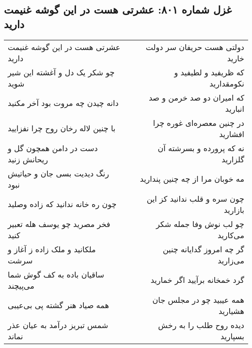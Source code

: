 \begin{center}
\section*{غزل شماره ۸۰۱: عشرتی هست در این گوشه غنیمت دارید}
\label{sec:0801}
\begin{longtable}{l p{0.5cm} r}
عشرتی هست در این گوشه غنیمت دارید
&&
دولتی هست حریفان سر دولت خارید
\\
چو شکر یک دل و آغشته این شیر شوید
&&
که ظریفید و لطیفید و نکومقدارید
\\
دانه چیدن چه مروت بود آخر مکنید
&&
که امیران دو صد خرمن و صد انبارید
\\
با چنین لاله رخان روح چرا نفزایید
&&
در چنین معصره‌ای غوره چرا افشارید
\\
دست در دامن همچون گل و ریحانش زنید
&&
نه که پرورده و بسرشته آن گلزارید
\\
رنگ دیدیت بسی جان و حیاتیش نبود
&&
مه خوبان مرا از چه چنین پندارید
\\
چون ره خانه ندانید که زاده وصلید
&&
چون سره و قلب ندانید کز این بازارید
\\
فخر مصرید چو یوسف هله تعبیر کنید
&&
چو لب نوش وفا جمله شکر می‌کارید
\\
ملکانید و ملک زاده ز آغاز و سرشت
&&
گر چه امروز گدایانه چنین می‌زارید
\\
ساقیان باده به کف گوش شما می‌پیچند
&&
گرد خمخانه برآیید اگر خمارید
\\
همه صیاد هنر گشته پی بی‌عیبی
&&
همه عیبید چو در مجلس جان هشیارید
\\
شمس تبریز درآمد به عیان عذر نماند
&&
دیده روح طلب را به رخش بسپارید
\\
\end{longtable}
\end{center}
